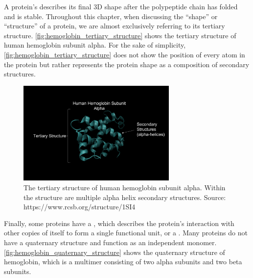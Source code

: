 A protein's  describes its final 3D shape after the polypeptide chain has folded and is stable. Throughout this chapter, when discussing the ``shape'' or ``structure'' of a protein, we are almost exclusively referring to its tertiary structure. \autoref{fig:hemoglobin_tertiary_structure} shows the tertiary structure of human hemoglobin subunit alpha. For the sake of simplicity, \autoref{fig:hemoglobin_tertiary_structure} does not show the position of every atom in the protein but rather represents the protein shape as a composition of secondary structures.

\begin{figure}[h]
	\centering
	\mySfFamily
	\includegraphics[width = 0.7\textwidth]{../images/hemoglobin_tertiary_structure.png}
	\caption{The tertiary structure of human hemoglobin subunit alpha. Within the structure are multiple alpha helix secondary structures. Source: https://www.rcsb.org/structure/1SI4}
	\label{fig:hemoglobin_tertiary_structure}
\end{figure}

Finally, some proteins have a , which describes the protein’s interaction with other copies of itself to form a single functional unit, or a . Many proteins do not have a quaternary structure and function as an independent monomer. \autoref{fig:hemoglobin_quaternary_structure} shows the quaternary structure of hemoglobin, which is a multimer consisting of two alpha subunits and two beta subunits.

